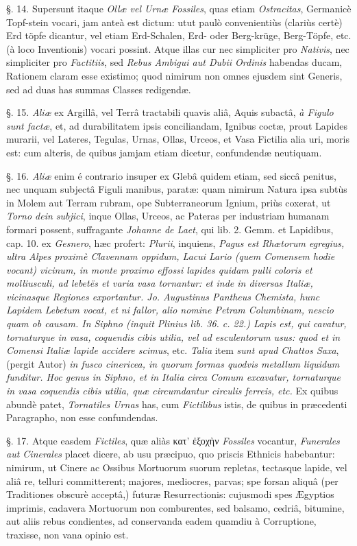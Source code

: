 \documentclass[a4paper, 11pt, oneside, polutonikogreek, german]{article}
\begin{document}
§. 14. Supersunt itaque \emph{Ollæ vel Urnæ Fossiles}, quas etiam \emph{Ostracitas}, Germanicè Topf-stein vocari, jam anteà est dictum: utut paulò convenientiùs (clariùs certè) Erd töpfe dicantur, vel etiam Erd-Schalen, Erd- oder Berg-krüge, Berg-Töpfe, etc. (à loco Inventionis) vocari possint. Atque illas cur nec simpliciter pro \emph{Nativis}, nec simpliciter pro \emph{Factitiis}, sed \emph{Rebus Ambigui aut Dubii Ordinis} habendas ducam, Rationem claram esse existimo; quod nimirum non omnes ejusdem sint Generis, sed ad duas has summas Classes redigendæ.

§. 15. \emph{Aliæ} ex Argillâ, vel Terrâ tractabili quavis aliâ, Aquis subactâ, \emph{à Figulo sunt factæ}, et, ad durabilitatem ipsis conciliandam, Ignibus coctæ, prout Lapides murarii, vel Lateres, Tegulas, Urnas, Ollas, Urceos, et Vasa Fictilia alia uri, moris est: cum alteris, de quibus jamjam etiam dicetur, confundendæ neutiquam.

§. 16. \emph{Aliæ} enim é contrario insuper ex Glebâ quidem etiam, sed siccâ penitus, nec unquam subjectâ Figuli manibus, paratæ: quam nimirum Natura ipsa subtùs in Molem aut Terram rubram, ope Subterraneorum Ignium, priùs coxerat, ut \emph{Torno dein subjici}, inque Ollas, Urceos, ac Pateras per industriam humanam formari possent, suffragante \emph{Johanne de Laet}, qui lib. 2. Gemm. et Lapidibus, cap. 10. ex \emph{Gesnero}, hæc profert: \emph{Plurii}, inquiens, \emph{Pagus est Rhætorum egregius, ultra Alpes proximè Clavennam oppidum, Lacui Lario (quem Comensem hodie vocant) vicinum, in monte proximo effossi lapides quidam pulli coloris et molliusculi, ad lebetës et varia vasa tornantur: et inde in diversas Italiæ, vicinasque Regiones exportantur. Jo. Augustinus Pantheus Chemista, hunc Lapidem Lebetum vocat, et ni fallor, alio nomine Petram Columbinam, nescio quam ob causam. In Siphno (inquit Plinius lib. 36. c. 22.) Lapis est, qui cavatur, tornaturque in vasa, coquendis cibis utilia, vel ad esculentorum usus: quod et in Comensi Italiæ lapide accidere scimus}, etc. \emph{Talia} item \emph{sunt apud Chattos Saxa}, (pergit Autor) \emph{in fusco cinericea, in quorum formas quodvis metallum liquidum funditur. Hoc genus in Siphno, et in Italia circa Comum excavatur, tornaturque in vasa coquendis cibis utilia, quæ circumdantur circulis ferreis, etc.} Ex quibus abundè patet, \emph{Tornatiles Urnas} has, cum \emph{Fictilibus} istis, de quibus in præcedenti Paragrapho, non esse confundendas.

§. 17. Atque easdem \emph{Fictiles}, quæ aliàs κατ' ἐξοχὴν \emph{Fossiles} vocantur, \emph{Funerales aut Cinerales} placet dicere, ab usu præcipuo, quo priscis Ethnicis habebantur: nimirum, ut Cinere ac Ossibus Mortuorum suorum repletas, tectasque lapide, vel aliâ re, telluri committerent; majores, mediocres, parvas; spe forsan aliquâ (per Traditiones obscurè acceptâ,) futuræ Resurrectionis: cujusmodi spes Ægyptios imprimis, cadavera Mortuorum non comburentes, sed balsamo, cedriâ, bitumine, aut aliis rebus condientes, ad conservanda eadem quamdiu à Corruptione, traxisse, non vana opinio est.
\end{document}
